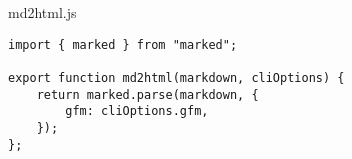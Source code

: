 \begin{listtitle}
md2html.js
\end{listtitle}
\begin{lstlisting}
import { marked } from "marked";

export function md2html(markdown, cliOptions) {
    return marked.parse(markdown, {
        gfm: cliOptions.gfm,
    });
};
\end{lstlisting}
\listend
